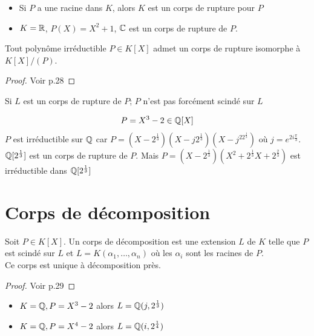 \documentclass[]{report}
\begin{document}
    \begin{re}{}{}
        \begin{itemize}
            \item Si $P$ a une racine dans $K$, alors $K$ est un corps de rupture pour $P$
            \item $K=\mathbb{R}$, $P(X)=X^2+1$, $\mathbb{C}$ est un corps de rupture de $P$.
        \end{itemize}
    \end{re}

    \begin{tm}{}{}
        Tout polynôme irréductible $P\in K[X]$ admet un corps de rupture isomorphe à $K[X]/(P)$.
    \end{tm}

    \begin{proof}
        Voir p.28
    \end{proof}

    \begin{re}{}{}
        Si $L$ est un corps de rupture de $P$; $P$ n'est pas forcément scindé sur $L$
    \end{re}

    \begin{ex}{}{}
        $$P=X^3-2\in\mathbb{Q}[X]$$
        $P$ est irréductible sur $\mathbb{Q}$ car $P=(X-2^{\frac{1}{3}})(X-j2^{\frac{1}{3}})(X-j^22^{\frac{1}{3}})$ où $j=e^{2i\frac{\pi}{3}}$.\\
        $\mathbb{Q}[2^\frac{1}{3}]$ est un corps de rupture de $P$. Mais $P=(X-2^{\frac{1}{3}})(X^2+2^\frac{1}{3}X+2^\frac{2}{3})$ est irréductible dans $\mathbb{Q}[2^\frac{1}{3}]$
    \end{ex}

    \section{Corps de décomposition}

    \begin{df}{}{}
        Soit $P\in K[X]$. Un corps de décomposition est une extension $L$ de $K$ telle que $P$ est scindé sur $L$ et $L=K(\alpha_1,\dots,\alpha_n)$ où les $\alpha_i$ sont les racines de $P$.\\
        Ce corps est unique à décomposition près.
    \end{df}

    \begin{proof}
        Voir p.29
    \end{proof}

    \begin{ex}{}{}
        \begin{itemize}
            \item $K=\mathbb{Q},P=X^3-2$ alors $L=\mathbb{Q}(j,2^\frac{1}{3})$
            \item $K=\mathbb{Q},P=X^4-2$ alors $L=\mathbb{Q}(i,2^\frac{1}{4})$
        \end{itemize}
    \end{ex}
\end{document}
